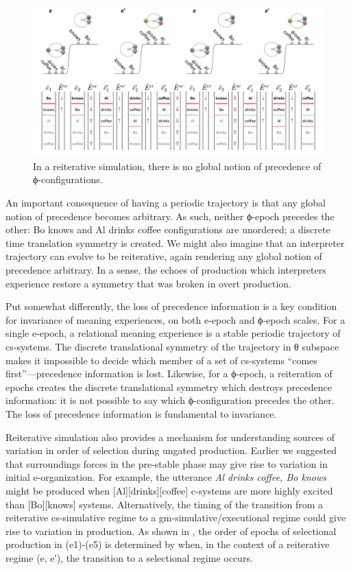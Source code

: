   
\begin{figure}
\includegraphics[width=\textwidth]{figures/Tilsen-img115.png}
\caption{In a reiterative simulation, there is no global notion of precedence of ϕ-configurations.}
\label{fig:5:11}
\end{figure}
 

  An important consequence of having a periodic trajectory is that any global notion of precedence becomes arbitrary. As such, neither ϕ-epoch precedes the other: {\textbar}Bo knows{\textbar} and {\textbar}Al drinks coffee{\textbar} configurations are unordered; a discrete time translation symmetry is created. We might also imagine that an interpreter trajectory can evolve to be reiterative, again rendering any global notion of precedence arbitrary. In a sense, the echoes of production which interpreters experience restore a symmetry that was broken in overt production. 

  Put somewhat differently, the loss of precedence information is a key condition for invariance of meaning experiences, on both e-epoch and ϕ-epoch scales. For a single e-epoch, a relational meaning experience is a stable periodic trajectory of cs-systems. The discrete translational symmetry of the trajectory in θ subspace makes it impossible to decide which member of a set of cs-systems “comes first”—precedence information is lost. Likewise, for a ϕ-epoch, a reiteration of epochs creates the discrete translational symmetry which destroys precedence information: it is not possible to say which ϕ-configuration precedes the other. The loss of precedence information is fundamental to invariance. 

  Reiterative simulation also provides a mechanism for understanding sources of variation in order of selection during ungated production. Earlier we suggested that surroundings forces in the pre-stable phase may give rise to variation in initial e-organization. For example, the utterance \textit{Al drinks coffee, Bo knows} might be produced when [Al][drinks][coffee] c-systems are more highly excited than [Bo][knows] systems. Alternatively, the timing of the transition from a reiterative cs-simulative regime to a gm-simulative/executional regime could give rise to variation in production. As shown in {}, the order of epochs of selectional production in (e1)-(e5) is determined by when, in the context of a reiterative regime (e, e′), the transition to a selectional regime occurs.

